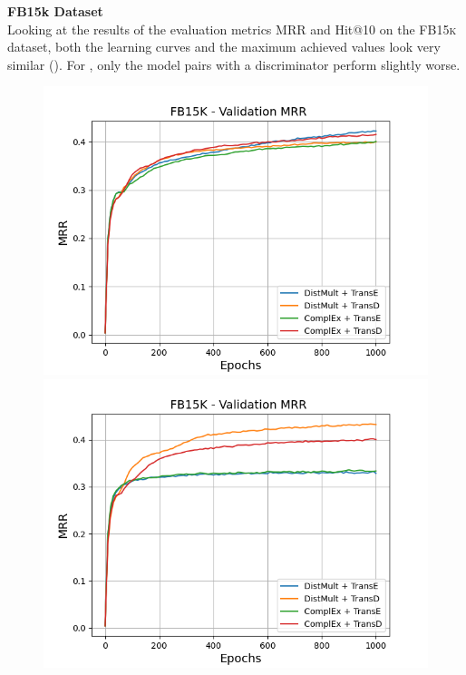 \textbf{FB15k Dataset}
\label{subsubsec:uncertainty_fb15k}\\
%
Looking at the results of the evaluation metrics MRR and Hit@10 on the \textsc{FB15k} dataset, both the learning curves and the maximum achieved values look very similar ().
For \usgan, only the model pairs with a \transe discriminator perform slightly worse.
\begin{figure}[H]
    \centering
    \begin{minipage}{.5\textwidth}
      \centering
      \includegraphics[width=0.9\linewidth]{figures/results/gan_train/not_pretrained/random/fb15k/1k_epochs/random_fb15k_mrrs.png}
    \end{minipage}%
    \begin{minipage}{.5\textwidth}
      \centering
      \includegraphics[width=0.9\linewidth]{figures/results/gan_train/not_pretrained/uncertainty/max_distribution/entropy/fb15k/1k_epochs/uncertainty_fb15k_mrrs.png}

\end{minipage}
\end{figure}
